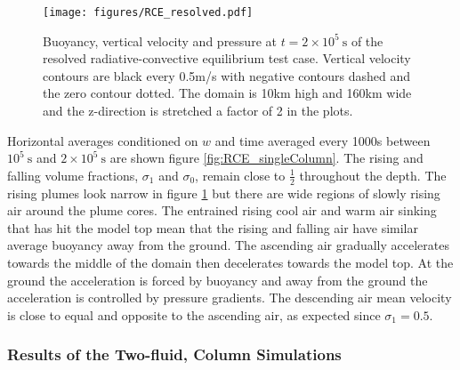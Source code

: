\documentclass[draft]{agujournal2019}
\begin{document}
\begin{figure}
\noindent 
\texttt{[image: figures/RCE\_resolved.pdf]}
\caption{\label{fig:RCE_resolved}
Buoyancy, vertical velocity and pressure at $t=2\times10^{5}\ \text{s}$
of the resolved radiative-convective equilibrium test case. Vertical
velocity contours are black every 0.5m/s with negative contours dashed
and the zero contour dotted. The domain is 10km high and 160km wide
and the z-direction is stretched a factor of 2 in the plots.}
\end{figure}

Horizontal averages conditioned on $w$ and time averaged every 1000s
between $10^{5}\ \text{s}$ and $2\times10^{5}\ \text{s}$ are shown
 figure \ref{fig:RCE_singleColumn}. The rising and
falling volume fractions, $\sigma_{1}$ and $\sigma_{0}$, remain
close to $\frac{1}{2}$ throughout the depth. The rising plumes look
narrow in figure \ref{fig:RCE_resolved} but there are wide regions
of slowly rising air around the plume cores. The entrained rising
cool air and warm air sinking that has hit the model top mean that
the rising and falling air have similar average buoyancy away from
the ground. The ascending air gradually accelerates towards the middle
of the domain then decelerates towards the model top. At the ground
the acceleration is forced by buoyancy and away from the ground the
acceleration is controlled by pressure gradients. The descending air
mean velocity is close to equal and opposite to the ascending air,
as expected since $\sigma_{1}=0.5$.

\subsubsection{Results of the Two-fluid,  Column Simulations}
\end{document}
